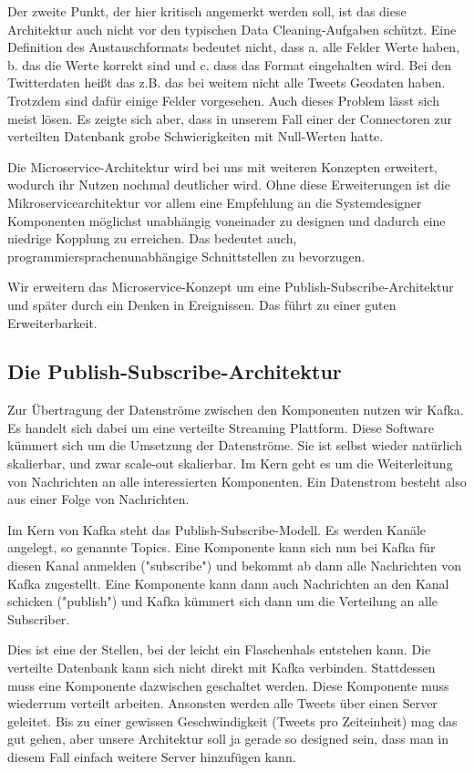 Der zweite Punkt, der hier kritisch angemerkt werden soll, ist das diese Architektur auch nicht vor den typischen
Data Cleaning-Aufgaben schützt. Eine Definition des Austauschformats bedeutet nicht, dass  a. alle Felder Werte haben,
b. das die Werte korrekt sind und c. dass das Format eingehalten wird. Bei den Twitterdaten heißt das z.B. das bei
weitem nicht alle Tweets Geodaten haben. Trotzdem sind dafür einige Felder vorgesehen. Auch dieses Problem lässt sich
meist lösen. Es zeigte sich aber, dass in unserem Fall einer der Connectoren zur verteilten Datenbank grobe Schwierigkeiten
mit Null-Werten hatte.

Die Microservice-Architektur wird bei uns mit weiteren Konzepten erweitert, wodurch ihr Nutzen nochmal deutlicher
wird. Ohne diese Erweiterungen ist die Mikroservicearchitektur vor allem eine Empfehlung an die Systemdesigner Komponenten möglichst unabhängig
voneinader zu designen und dadurch eine niedrige Kopplung zu erreichen. Das bedeutet auch, programmiersprachenunabhängige Schnittstellen zu bevorzugen.

Wir erweitern das Microservice-Konzept um eine Publish-Subscribe-Architektur und später durch ein Denken in Ereignissen.
Das führt zu einer guten Erweiterbarkeit.

\subsection{Die Publish-Subscribe-Architektur}
Zur Übertragung der Datenströme zwischen den Komponenten nutzen wir Kafka. Es handelt sich dabei um eine verteilte
Streaming Plattform.  Diese Software kümmert sich um die Umsetzung der Datenströme. Sie ist selbst wieder natürlich
skalierbar, und zwar scale-out skalierbar. Im Kern geht es um die Weiterleitung von Nachrichten an alle interessierten Komponenten.
Ein Datenstrom besteht also aus einer Folge von Nachrichten.

Im Kern von Kafka steht das Publish-Subscribe-Modell. Es werden Kanäle angelegt, so genannte Topics. Eine Komponente
kann sich nun bei Kafka für diesen Kanal anmelden ("subscribe") und bekommt ab dann alle Nachrichten von Kafka zugestellt.
Eine Komponente kann dann auch Nachrichten an den Kanal schicken ("publish") und Kafka kümmert sich dann um die Verteilung
an alle Subscriber.

Dies ist eine der Stellen, bei der leicht ein Flaschenhals entstehen kann. Die verteilte Datenbank kann sich nicht direkt
mit Kafka verbinden. Stattdessen muss eine Komponente dazwischen geschaltet werden. Diese Komponente
muss wiederrum verteilt arbeiten. Ansonsten werden alle Tweets über einen Server geleitet. Bis zu einer gewissen
Geschwindigkeit (Tweets pro Zeiteinheit) mag das gut gehen, aber unsere Architektur soll ja gerade so designed sein,
dass man in diesem Fall einfach weitere Server hinzufügen kann.


